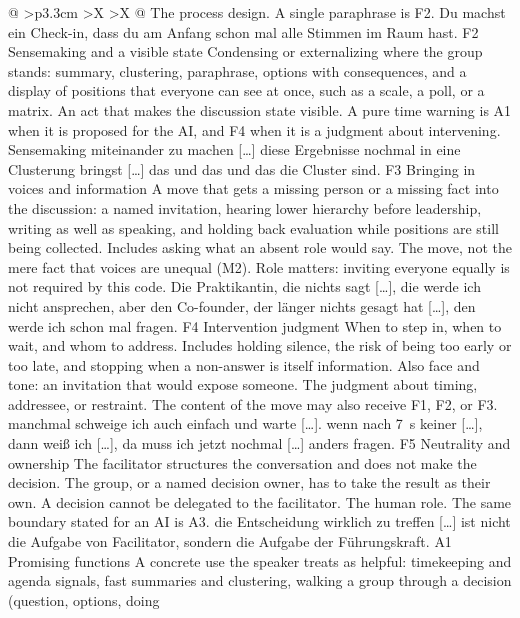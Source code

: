 \begin{xltabular}{\textwidth}{@{}
    >{\RaggedRight\arraybackslash}p{3.3cm}
    >{\RaggedRight\arraybackslash}X
    >{\RaggedRight\arraybackslash}X
  @{}}
  {The process design. A single paraphrase is F2.}
  {Du machst ein Check-in, dass du am Anfang schon mal alle Stimmen im Raum hast.}
  \cbgap
  \cbrow
  {F2}
  {Sensemaking and a visible state}
  {Condensing or externalizing where the group stands: summary, clustering, paraphrase,
    options with consequences, and a display of positions that everyone can see at once, such
  as a scale, a poll, or a matrix.}
  {An act that makes the discussion state visible. A pure time warning is A1 when it is
  proposed for the AI, and F4 when it is a judgment about intervening.}
  {Sensemaking miteinander zu machen [\ldots] diese Ergebnisse nochmal in eine Clusterung
  bringst [\ldots] das und das und das die Cluster sind.}
  \cbgap
  \cbrow
  {F3}
  {Bringing in voices and information}
  {A move that gets a missing person or a missing fact into the discussion: a named
    invitation, hearing lower hierarchy before leadership, writing as well as speaking, and
    holding back evaluation while positions are still being collected. Includes asking what an
  absent role would say.}
  {The move, not the mere fact that voices are unequal (M2). Role matters: inviting everyone
  equally is not required by this code.}
  {Die Praktikantin, die nichts sagt [\ldots], die werde ich nicht ansprechen, aber den
  Co-founder, der länger nichts gesagt hat [\ldots], den werde ich schon mal fragen.}
  \cbgap
  \cbrow
  {F4}
  {Intervention judgment}
  {When to step in, when to wait, and whom to address. Includes holding silence, the risk of
    being too early or too late, and stopping when a non-answer is itself information. Also
  face and tone: an invitation that would expose someone.}
  {The judgment about timing, addressee, or restraint. The content of the move may also
  receive F1, F2, or F3.}
  {manchmal schweige ich auch einfach und warte [\ldots]. wenn nach 7~s keiner [\ldots], dann
  weiß ich [\ldots], da muss ich jetzt nochmal [\ldots] anders fragen.}
  \cbgap
  \cbrow
  {F5}
  {Neutrality and ownership}
  {The facilitator structures the conversation and does not make the decision. The group, or
    a named decision owner, has to take the result as their own. A decision cannot be delegated
  to the facilitator.}
  {The human role. The same boundary stated for an AI is A3.}
  {die Entscheidung wirklich zu treffen [\ldots] ist nicht die Aufgabe von Facilitator,
  sondern die Aufgabe der Führungskraft.}
  \cbcatbreak
  \cbrow
  {A1}
  {Promising functions}
  {A concrete use the speaker treats as helpful: timekeeping and agenda signals, fast
    summaries and clustering, walking a group through a decision (question, options, doing
}
\end{xltabular}

